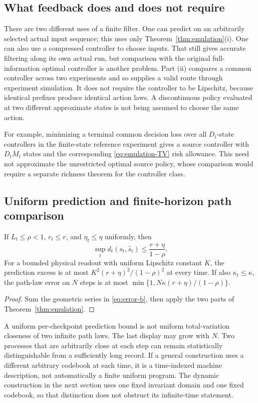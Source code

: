 \subsection{What feedback does and does not require}
There are two different uses of a finite filter. One can predict on an
arbitrarily selected actual input sequence; this uses only
Theorem~\ref{thm:emulation}\textup{(i)}. One can also use a compressed
controller to choose inputs. That still gives accurate filtering along its
own actual run, but comparison with the original full-information optimal
controller is another problem. Part \textup{(ii)} compares a common
controller across two experiments and so supplies a valid route through
experiment simulation. It does not require the controller to be Lipschitz,
because identical prefixes produce identical action laws. A discontinuous
policy evaluated at two different approximate states is not being assumed
to choose the same action.

For example, minimizing a terminal common decision loss over all
$D_t$-state controllers in the finite-state reference experiment gives a
source controller with $D_tM_t$ states and the corresponding
\eqref{eq:emulation-TV} risk allowance. This need not approximate the
unrestricted optimal source policy, whose comparison would require a
separate richness theorem for the controller class.

\subsection{Uniform prediction and finite-horizon path comparison}
\begin{corollary}\label{cor:contractive}
If $L_t\le\rho<1$, $r_t\le r$, and $\eta_t\le\eta$ uniformly, then
\[
 \sup_td_t(s_t,\hat s_t)\le\frac{r+\eta}{1-\rho}.
\]
For a bounded physical readout with uniform Lipschitz constant $K$, the
prediction excess is at most $K^2(r+\eta)^2/(1-\rho)^2$ at every time.
If also $\kappa_t\le\kappa$, the path-law error on $N$ steps is at most
$\min\{1,N\kappa(r+\eta)/(1-\rho)\}$.
\end{corollary}
\begin{proof}
Sum the geometric series in \eqref{eq:error-b}, then apply the two parts of
Theorem~\ref{thm:emulation}.
\end{proof}

A uniform per-checkpoint prediction bound is not uniform total-variation
closeness of two infinite path laws. The last display may grow with $N$.
Two processes that are arbitrarily close at each step can remain
statistically distinguishable from a sufficiently long record.
If a general construction uses a different arbitrary codebook at each
time, it is a time-indexed machine description, not automatically a finite
uniform program. The dynamic construction in the next section uses one
fixed invariant domain and one fixed codebook, so that distinction does
not obstruct its infinite-time statement.

